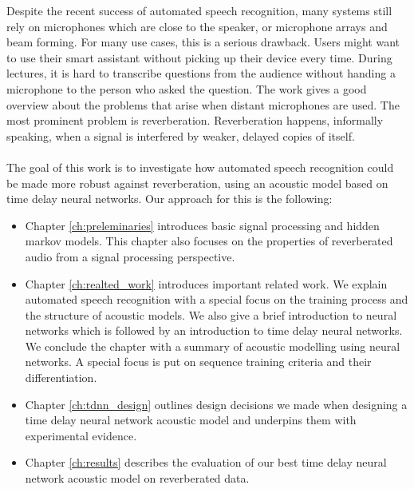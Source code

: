 Despite the recent success of automated speech recognition, many systems still rely on microphones which are close to the speaker, or microphone arrays and beam forming. For many use cases, this is a serious drawback. Users might want to use their smart assistant without picking up their device every time. During lectures, it is hard to transcribe questions from the audience without handing a microphone to the person who asked the question.
The work \cite{yoshioka2012making} gives a good overview about the problems that arise when distant microphones are used. The most prominent problem is reverberation. Reverberation happens, informally speaking, when a signal is interfered by weaker, delayed copies of itself. \\ \\
The goal of this work is to investigate how automated speech recognition could be made more robust against reverberation, using an acoustic model based on time delay neural networks. Our approach for this is the following: 
\begin{itemize}
\item Chapter \ref{ch:preleminaries} introduces basic signal processing and hidden markov models. This chapter also focuses on the properties of reverberated audio from a signal processing perspective.
\item Chapter \ref{ch:realted_work} introduces important related work. We explain automated speech recognition with a special focus on the training process and the structure of acoustic models. We also give a brief introduction to neural networks which is followed by an introduction to time delay neural networks. We conclude the chapter with a summary of acoustic modelling using neural networks. A special focus is put on sequence training criteria and their differentiation. 
\item Chapter \ref{ch:tdnn_design} outlines design decisions we made when designing a time delay neural network acoustic model and underpins them with experimental evidence. 
\item Chapter \ref{ch:results} describes the evaluation of our best time delay neural network acoustic model on reverberated data.
\iffalse
Before we explain the properties of time delay neural networks in depth, we first introduce neural networks in section \ref{sec:neural_networks} as well as the basics of automated speech recognition in section \ref{ch:HMM_ASR}. In chapter \ref{ch:approach} we will explain our solution in detail and then show experimental results in chapter \ref{ch:results}.
\fi
\end{itemize}

